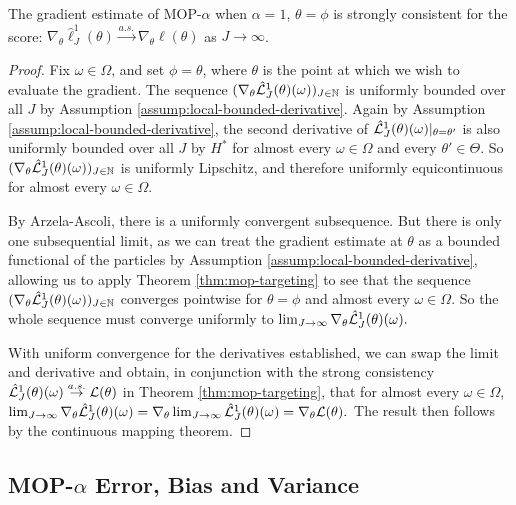 \documentclass[9pt,twocolumn,pnasresearcharticle]{pnas-new}
\begin{document}
\begin{thm}
    The gradient estimate of MOP-$\alpha$ when $\alpha=1$, $\theta=\phi$ is strongly consistent for the score: $\nabla_\theta \hat\ell_J^1(\theta) \stackrel{a.s.}{\to} \nabla_\theta \ell(\theta)$ as $J \to \infty$.
    \label{thm:mop-grad-consistency}
\end{thm}
\begin{proof}
    Fix $\omega \in \Omega$, and set $\phi = \theta$, where $\theta$ is the point at which we wish to evaluate the gradient. The sequence $(\nabla_\theta \hat{\mathcal{L}}_J^1(\theta)(\omega))_{J \in \mathbb{N}}$ is uniformly bounded over all $J$ by Assumption \ref{assump:local-bounded-derivative}. Again by Assumption \ref{assump:local-bounded-derivative}, the second derivative of $\hat{\mathcal{L}}_J^1(\theta)(\omega)|_{\theta=\theta'}$ is also uniformly bounded over all $J$ by $H^*$ for almost every $\omega\in \Omega$ and every $\theta'\in \Theta$. So $(\nabla_\theta \hat{\mathcal{L}}_J^1(\theta)( \omega))_{J \in \mathbb{N}}$ is uniformly Lipschitz, and therefore uniformly equicontinuous for almost every $\omega \in \Omega$.

    By Arzela-Ascoli, there is a uniformly convergent subsequence. But there is only one subsequential limit, as we can treat the gradient estimate at $\theta$ as a bounded functional of the particles by Assumption \ref{assump:local-bounded-derivative}, allowing us to apply Theorem \ref{thm:mop-targeting} to see that the sequence $(\nabla_\theta \hat{\mathcal{L}}_J^1(\theta)(\omega))_{J \in \mathbb{N}}$ converges pointwise for $\theta=\phi$ and almost every $\omega \in \Omega$. So the whole sequence must converge uniformly to $\lim_{J \to \infty} \nabla_\theta \hat{\mathcal{L}}_J^1(\theta)(\omega).$ 
    
    With uniform convergence for the derivatives established, we can swap the limit and derivative and obtain, in conjunction with the strong consistency $\hat{\mathcal{L}}_J^1(\theta)(\omega) \stackrel{a.s.}{\to} \mathcal{L}(\theta)$ in Theorem \ref{thm:mop-targeting}, that for almost every $\omega \in \Omega$, 
    $\lim_{J \to \infty} \nabla_\theta \hat{\mathcal{L}}_J^1(\theta)(\omega) = \nabla_\theta \lim_{J \to \infty} \hat{\mathcal{L}}_J^1(\theta)(\omega) = \nabla_\theta \mathcal{L}(\theta).$
    The result then follows by the continuous mapping theorem. 
\end{proof}


\subsection{MOP-$\alpha$ Error, Bias and Variance}
\end{document}
